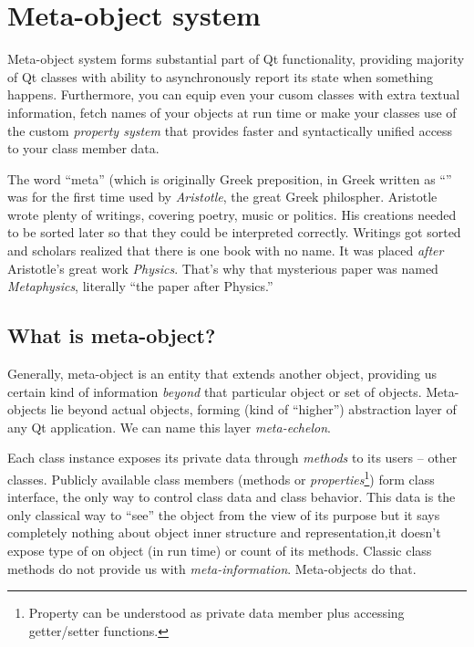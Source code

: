 \section{Meta-object system}
Meta-object system forms substantial part of Qt functionality, providing majority of Qt classes with ability to asynchronously report its state when something happens. Furthermore, you can equip even your cusom classes with extra textual information, fetch names of your objects at run time or make your classes use of the custom \textit{property system} that provides faster and syntactically unified access to your class member data.

\begin{fdocextra}
The word \enquote{meta} (which is originally Greek preposition, in Greek written as \enquote{\textmu \textepsilon \texttau \textalpha} was for the first time used by \textit{Aristotle}, the great Greek philospher. Aristotle wrote plenty of writings, covering poetry, music or politics. His creations needed to be sorted later so that they could be interpreted correctly. Writings got sorted and scholars realized that there is one book with no name. It was placed \textit{after} Aristotle's great work \textit{Physics}. That's why that mysterious paper was named \textit{Metaphysics}, literally \enquote{the paper after Physics.}
\end{fdocextra}

\subsection{What is meta-object?}
Generally, meta-object is an entity that extends another object, providing us certain kind of information \textit{beyond} that particular object or set of objects. Meta-objects lie beyond actual objects, forming (kind of \enquote{higher}) abstraction layer of any Qt application. We can name this layer \textit{meta-echelon}.

Each class instance exposes its private data through \textit{methods} to its users -- other classes. Publicly available class members (methods or \textit{properties}\footnote{Property can be understood as private data member plus accessing getter/setter functions.}) form class interface, the only way to control class data and class behavior. This data is the only classical way to \enquote{see} the object from the view of its purpose but it says completely nothing about object inner structure and representation,\eg it doesn't expose type of on object (in run time) or count of its methods. Classic class methods do not provide us with \textit{meta-information}. Meta-objects do that.

